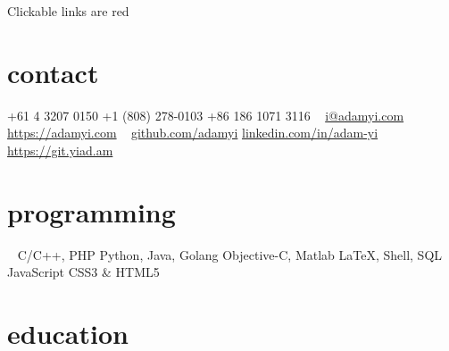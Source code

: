 \documentclass[hidelinks__VERSION__]{adamyi-cv}
\begin{document}



\begin{aside} %
Clickable links are red
\section{contact}
+61 4 3207 0150
+1 (808) 278-0103
+86 186 1071 3116
~
\href{mailto:i@adamyi.com}{i@adamyi.com}
\href{https://www.adamyi.com}{https://adamyi.com}
~
\href{https://github.com/adamyi}{github.com/adamyi}
\small\href{https://linkedin.com/in/adam-yi}{linkedin.com/in/adam-yi}
\href{https://git.yiad.am}{https://git.yiad.am}
\section{programming}
~
C/C++, PHP
Python, Java, Golang
Objective-C, Matlab
\LaTeX, Shell, SQL
JavaScript
CSS3 \& HTML5
\versionsection
\end{aside}


\section{education}
\end{document}
